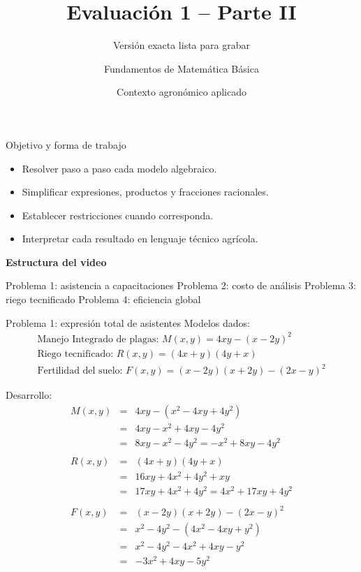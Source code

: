 \documentclass{beamer}
\title{Evaluación 1 -- Parte II}
\subtitle{Versión exacta lista para grabar}
\author{Fundamentos de Matemática Básica}
\date{Contexto agronómico aplicado}
\begin{document}
	
	\begin{frame}
		\titlepage
	\end{frame}
	
	\begin{frame}{Objetivo y forma de trabajo}
		\begin{itemize}
			\item Resolver paso a paso cada modelo algebraico.
			\item Simplificar expresiones, productos y fracciones racionales.
			\item Establecer restricciones cuando corresponda.
			\item Interpretar cada resultado en lenguaje técnico agrícola.
		\end{itemize}
		
		\textbf{Estructura del video}
		
		Problema 1: asistencia a capacitaciones \quad
		Problema 2: costo de análisis \quad
		Problema 3: riego tecnificado \quad
		Problema 4: eficiencia global
	\end{frame}
	
	\begin{frame}{Problema 1: expresión total de asistentes}
		Modelos dados:
		\[
		\begin{array}{l}
			\text{Manejo Integrado de plagas: }	M(x,y)=4xy-(x-2y)^2 \\
			\text{Riego tecnificado: }	R(x,y)=(4x+y)(4y+x) \\
			\text{Fertilidad del suelo: }	F(x,y)=(x-2y)(x+2y)-(2x-y)^2
		\end{array}
		\]
		
		Desarrollo:
		\[
		\begin{array}{lcl}
			M(x,y)&=&4xy-(x^2-4xy+4y^2) \\
			&=&4xy-x^2+4xy-4y^2 \\
			&=&8xy-x^2-4y^2=-x^2+8xy-4y^2 \\
			&	&	    \\    
			R(x,y)&=&(4x+y)(4y+x) \\
			&=&16xy+4x^2+4y^2+xy \\
			&=&17xy+4x^2+4y^2 = 4x^2+17xy+4y^2 \\
			& &	\\	
			F(x,y)&=&(x-2y)(x+2y)-(2x-y)^2 \\
			&=&x^2-4y^2-(4x^2-4xy+y^2) \\
			&=&x^2-4y^2-4x^2+4xy-y^2 \\
			&=&-3x^2+4xy-5y^2
		\end{array} 
		\]
		
	\end{frame}
	
\end{document}
